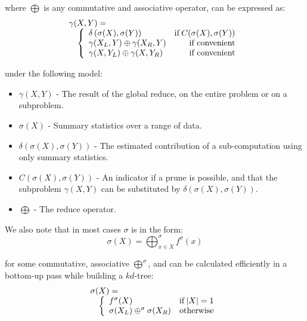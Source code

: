 \documentclass[times, 10pt,twocolumn]{article}
\DeclareMathOperator{\IF}{if}
\begin{document}
\noindent where $\bigoplus$ is any commutative and associative operator, can be expressed as:
\begin{equation}
\label{eqn:global_intrinsic}
 \begin{array}{ll}
  \lefteqn{\gamma(X, Y) =}
  \\
  & \left\{
    \begin{array}{lr}
      \delta \left( \sigma(X), \sigma(Y) \right) & \IF C(\sigma(X), \sigma(Y))
      \\
      \gamma(X_L, Y) \oplus \gamma(X_R, Y) & \mbox{if convenient}
      \\
      \gamma(X, Y_L) \oplus  \gamma(X, Y_R) & \mbox{if convenient}
    \end{array}
  \right.
 \end{array}
\end{equation}

\noindent under the following model:
\begin{itemize}
  \item $\gamma(X, Y)$ - The result of the global reduce, on the entire problem or on a subproblem.
  \item $\sigma(X)$ - Summary statistics over a range of data.
  \item $\delta(\sigma(X), \sigma(Y))$ - The estimated contribution of a sub-computation using only summary statistics.
  \item $C(\sigma(X), \sigma(Y))$ - An indicator if a prune is possible, and that the subproblem $\gamma(X, Y)$ can be substituted by $\delta(\sigma(X), \sigma(Y))$.
  \item $\bigoplus$ - The reduce operator.
\end{itemize}

\noindent We also note that in most cases $\sigma$ is in the form:
\begin{equation}
  \sigma(X) = \bigoplus^{\sigma}_{x \in X} f^{\sigma}(x)
\end{equation}

\noindent for some commutative, associative $\bigoplus^{\sigma}$, and can be calculated efficiently in a bottom-up pass while building a $kd$-tree:
\begin{equation}
\label{eqn:sigma}
 \begin{array}{ll}
  \lefteqn{\sigma(X) =}
  \\
  & \left\{
    \begin{array}{lr}
      f^{\sigma}(X) & \IF |X| = 1
      \\
      \sigma(X_L) \oplus^{\sigma} \sigma(X_R) & \mbox{otherwise}
    \end{array}
  \right.
 \end{array}
\end{equation}
\end{document}
